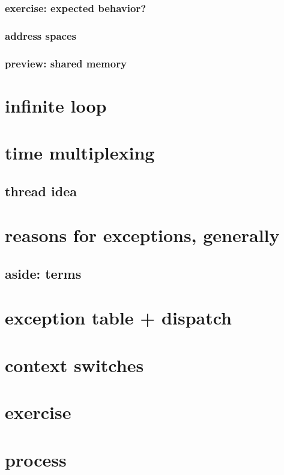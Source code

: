 \subsubsection{exercise: expected behavior?}


\subsubsection{address spaces}


\subsubsection{preview: shared memory}


\section{infinite loop}



\section{time multiplexing}


\subsection{thread idea}



\section{reasons for exceptions, generally}



\subsection{aside: terms}


\section{exception table + dispatch}



\section{context switches} %


\section{exercise}


\section{process}




